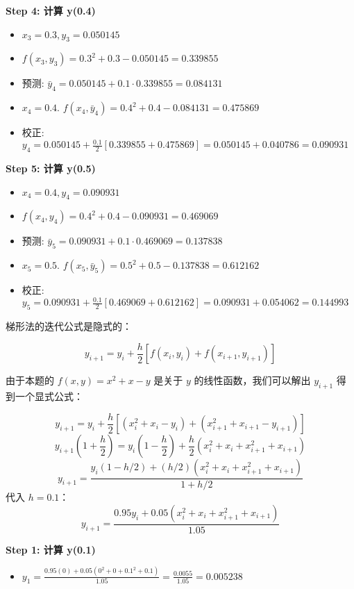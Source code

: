 \documentclass[11pt]{article}
\providecommand{\tightlist}{%
      \setlength{\itemsep}{0pt}\setlength{\parskip}{0pt}}
\begin{document}
\textbf{Step 4: 计算 y(0.4)}

\begin{itemize}
\tightlist
\item
  \(x_3 = 0.3, y_3 = 0.050145\)
\item
  \(f(x_3, y_3) = 0.3^2 + 0.3 - 0.050145 = 0.339855\)
\item
  预测: \(\bar{y}_4 = 0.050145 + 0.1 \cdot 0.339855 = 0.084131\)
\item
  \(x_4 = 0.4\).
  \(f(x_4, \bar{y}_4) = 0.4^2 + 0.4 - 0.084131 = 0.475869\)
\item
  校正:
  \(y_4 = 0.050145 + \frac{0.1}{2} [0.339855 + 0.475869] = 0.050145 + 0.040786 = \mathbf{0.090931}\)
\end{itemize}

\textbf{Step 5: 计算 y(0.5)}

\begin{itemize}
\tightlist
\item
  \(x_4 = 0.4, y_4 = 0.090931\)
\item
  \(f(x_4, y_4) = 0.4^2 + 0.4 - 0.090931 = 0.469069\)
\item
  预测: \(\bar{y}_5 = 0.090931 + 0.1 \cdot 0.469069 = 0.137838\)
\item
  \(x_5 = 0.5\).
  \(f(x_5, \bar{y}_5) = 0.5^2 + 0.5 - 0.137838 = 0.612162\)
\item
  校正:
  \(y_5 = 0.090931 + \frac{0.1}{2} [0.469069 + 0.612162] = 0.090931 + 0.054062 = \mathbf{0.144993}\)
\end{itemize}

梯形法的迭代公式是隐式的：

\[ y_{i+1} = y_i + \frac{h}{2} [f(x_i, y_i) + f(x_{i+1}, y_{i+1})] \]

由于本题的 \(f(x, y) = x^2 + x - y\) 是关于 \(y\)
的线性函数，我们可以解出 \(y_{i+1}\) 得到一个显式公式：

\[ y_{i+1} = y_i + \frac{h}{2} [(x_i^2 + x_i - y_i) + (x_{i+1}^2 + x_{i+1} - y_{i+1})] \]
\[ y_{i+1} (1 + \frac{h}{2}) = y_i (1 - \frac{h}{2}) + \frac{h}{2} (x_i^2 + x_i + x_{i+1}^2 + x_{i+1}) \]
\[ y_{i+1} = \frac{y_i (1 - h/2) + (h/2)(x_i^2 + x_i + x_{i+1}^2 + x_{i+1})}{1 + h/2} \]
代入 \(h=0.1\)：
\[ y_{i+1} = \frac{0.95 y_i + 0.05 (x_i^2 + x_i + x_{i+1}^2 + x_{i+1})}{1.05} \]

\textbf{Step 1: 计算 y(0.1)}

\begin{itemize}
\tightlist
\item
  \(y_1 = \frac{0.95(0) + 0.05(0^2+0+0.1^2+0.1)}{1.05} = \frac{0.0055}{1.05} = \mathbf{0.005238}\)
\end{itemize}
\end{document}
